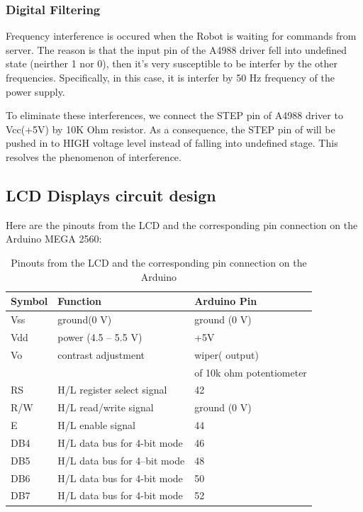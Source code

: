 \subsubsection{Digital Filtering}
Frequency interference is occured when the Robot is waiting for commands from server. The reason is that the input pin of the A4988 driver fell into undefined state (neirther 1 nor 0), then it's very susceptible to be interfer by the other frequencies. Specifically, in this case, it is interfer by 50 Hz frequency of the power supply.

To eliminate these interferences, we connect the STEP pin of A4988 driver to Vcc(+5V) by 10K Ohm resistor. 
As a consequence, the STEP pin of will be pushed in to HIGH voltage level instead of falling into undefined stage. This resolves the phenomenon of interference.


\subsection{LCD Displays circuit design}

Here are the pinouts from the LCD and the corresponding pin connection on the Arduino MEGA 2560:
\begin{table}[H]
	\centering
	\caption{Pinouts from the LCD and the corresponding pin connection on the Arduino}	
	\label{tab:LCD_connectto_Arduino}
	\begin{tabularx}{0.65\textwidth}{lll}
		\toprule
		\textbf{Symbol} & \textbf{Function} & \textbf{Arduino Pin} 	\\
		\midrule
		Vss & ground(0 V) & ground (0 V) 							\\
		\midrule
		Vdd & power (4.5 – 5.5 V) & +5V 							\\
		\midrule
		Vo & contrast adjustment & wiper( output) 					\\
		& & of 10k ohm potentiometer 								\\
		\midrule
		RS & H/L register select signal & 42 						\\
		\midrule
		R/W	& H/L read/write signal & ground (0 V) 					\\
		\midrule
		E & H/L enable signal	& 44 								\\
		\midrule
		DB4	& H/L data bus for 4-bit mode & 46 						\\
		\midrule
		DB5	& H/L data bus for 4--bit mode & 48 					\\
		\midrule
		DB6	& H/L data bus for 4-bit mode & 50 						\\
		\midrule
		DB7	& H/L data bus for 4-bit mode & 52 						\\
		\bottomrule
	\end{tabularx}
\end{table}


